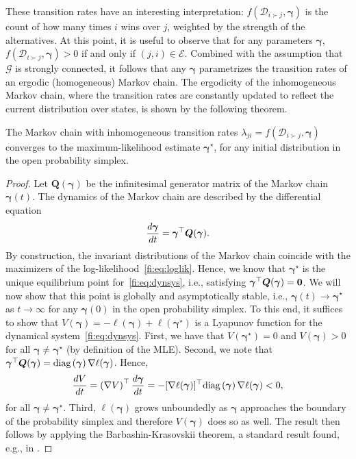 These transition rates have an interesting interpretation: $f(\mathcal{D}_{i \succ j}, \bm{\gamma})$ is the count of how many times $i$ wins over $j$, weighted by the strength of the alternatives.
At this point, it is useful to observe that for any parameters $\bm{\gamma}$, $f(\mathcal{D}_{i \succ j}, \bm{\gamma}) > 0$ if and only if $(j,i) \in \mathcal{E}$.
Combined with the assumption that $\mathcal{G}$ is strongly connected, it follows that any $\bm{\gamma}$ parametrizes the transition rates of an ergodic (homogeneous) Markov chain.
The ergodicity of the inhomogeneous Markov chain, where the transition rates are constantly updated to reflect the current distribution over states, is shown by the following theorem.
\begin{theorem}
\label{fi:thm:convergence}
The Markov chain with inhomogeneous transition rates $\lambda_{ji} = f(\mathcal{D}_{i \succ j}, \bm{\gamma})$ converges to the maximum-likelihood estimate $\bm{\gamma}^\star$, for any initial distribution in the open probability simplex.
\end{theorem}

\begin{proof}[Proof]
Let $\bm{Q}(\bm{\gamma})$ be the infinitesimal generator matrix of the Markov chain $\bm{\gamma}(t)$.
The dynamics of the Markov chain are described by the differential equation
\begin{align}
\label{fi:eq:dynsys}
\frac{d \bm{\gamma}}{dt} = \bm{\gamma}^\top \bm{Q}(\bm{\gamma}).
\end{align}
By construction, the invariant distributions of the Markov chain coincide with the maximizers of the log-likelihood~\eqref{fi:eq:loglik}.
Hence, we know that $\bm{\gamma}^\star$ is the unique equilibrium point for~\eqref{fi:eq:dynsys}, i.e., satisfying $\bm{\gamma}^\top \bm{Q}(\bm{\gamma}) = \bm{0}$.
We will now show that this point is globally and asymptotically stable, i.e., $\bm{\gamma}(t) \to \bm{\gamma}^\star$ as $t \to \infty$ for any $\bm{\gamma}(0)$ in the open probability simplex.
To this end, it suffices to show that $V(\bm{\gamma}) = - \ell(\bm{\gamma}) + \ell(\bm{\gamma}^\star)$ is a Lyapunov function for the dynamical system~\eqref{fi:eq:dynsys}.
First, we have that $V(\bm{\gamma}^\star) = 0$ and $V(\bm{\gamma}) > 0$ for all $\bm{\gamma} \ne \bm{\gamma}^\star$ (by definition of the MLE).
Second, we note that $\bm{\gamma}^\top \bm{Q}(\bm{\gamma}) = \text{diag} \left( \bm{\gamma} \right)  \nabla \ell(\bm{\gamma})$.
Hence,
\begin{align*}
\frac{dV}{dt}
    = \left( \nabla V \right)^\top \frac{d \bm{\gamma}}{dt}
    = - [\nabla \ell(\bm{\gamma})]^\top \text{diag} \left( \bm{\gamma} \right)  \nabla \ell(\bm{\gamma})
    < 0,
\end{align*}
for all $\bm{\gamma} \ne \bm{\gamma}^\star$.
Third, $\ell(\bm{\gamma})$ grows unboundedly as $\bm{\gamma}$ approaches the boundary of the probability simplex \citep[Lemma~1]{hunter2004mm} and therefore $V(\bm{\gamma})$ does so as well.
The result then follows by applying the Barbashin-Krasovskii theorem, a standard result found, e.g., in \citet[Chapter~3]{khalil1996nonlinear}.
\end{proof}


